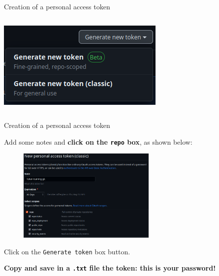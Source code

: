 \documentclass[10pt]{beamer}
\begin{document}
\begin{frame}[fragile]{Creation of a personal access token}
\begin{columns}
\begin{column}{0.3\textwidth}
\begin{center}
     \includegraphics[width=\textwidth]{img/access-token-3.png}
     \end{center}
\end{column}
\end{columns}

\end{frame}

\begin{frame}[fragile]{Creation of a personal access token}
\protect\hypertarget{creation-of-a-personal-access-token-2}{}

Add some notes and \textbf{click on the \texttt{repo} box}, as shown
below:

\begin{figure}

{\centering \includegraphics[width=0.6\textwidth]{img/access-token-2.png}

}

\end{figure}

Click on the \texttt{Generate\ token} box button.

\textbf{Copy and save in a \texttt{.txt} file the token: this is your
password!}
\end{frame}
\end{document}
